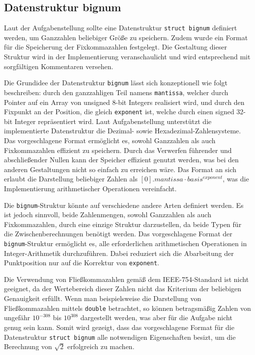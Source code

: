 \documentclass[course=erap]{aspdoc}
\begin{document}
\subsection{Datenstruktur bignum}
Laut der Aufgabenstellung sollte eine Datenstruktur \texttt{struct bignum} definiert werden, um Ganzzahlen beliebiger Größe zu speichern. Zudem wurde ein Format für die Speicherung der Fixkommazahlen festgelegt. Die Gestaltung dieser Struktur wird in der Implementierung veranschaulicht und wird entsprechend mit sorgfältigen Kommentaren versehen. 

Die Grundidee der Datenstruktur \texttt{bignum} lässt sich konzeptionell wie folgt beschreiben: durch den ganzzahligen Teil namens \texttt{mantissa}, welcher durch Pointer auf ein Array von unsigned 8-bit Integers realisiert wird, und durch den Fixpunkt an der Position, die gleich \texttt{exponent} ist, welche durch einen signed 32-bit Integer repräsentiert wird. Laut Aufgabenstellung unterstützt die implementierte Datenstruktur die Dezimal- sowie Hexadezimal-Zahlensysteme. Das vorgeschlagene Format ermöglicht es, sowohl Ganzzahlen als auch Fixkommazahlen effizient zu speichern. Durch das Verwerfen führender und abschließender Nullen kann der Speicher effizient genutzt werden, was bei den anderen Gestaltungen nicht so einfach zu erreichen wäre. Das Format an sich erlaubt die Darstellung beliebiger Zahlen als $[0].mantissa \cdot basis^{exponent}$, was die Implementierung arithmetischer Operationen vereinfacht.

Die \texttt{bignum}-Struktur könnte auf verschiedene andere Arten definiert werden. Es ist jedoch sinnvoll, beide Zahlenmengen, sowohl Ganzzahlen als auch Fixkommazahlen, durch eine einzige Struktur darzustellen, da beide Typen für die Zwischenberechnungen benötigt werden. Das vorgeschlagene Format der \texttt{bignum}-Struktur ermöglicht es, alle erforderlichen arithmetischen Operationen in Integer-Arithmetik durchzuführen. Dabei reduziert sich die Abarbeitung der Punktposition nur auf die Korrektur von \texttt{exponent}.

Die Verwendung von Fließkommazahlen gemäß dem IEEE-754-Standard ist nicht geeignet, da der Wertebereich dieser Zahlen nicht das Kriterium der beliebigen Genauigkeit erfüllt. Wenn man beispielsweise die Darstellung von Fließkommazahlen mittels \texttt{double} betrachtet, so können betragsmäßig  Zahlen von ungefähr $10^{-308}$ bis $10^{308}$ dargestellt werden, was aber für die Aufgabe nicht genug sein kann. Somit wird gezeigt, dass das vorgeschlagene Format für die Datenstruktur \texttt{struct bignum} alle notwendigen Eigenschaften besizt, um die Berechnung von $\sqrt{2}$ erfolgreich zu machen.
\end{document}
